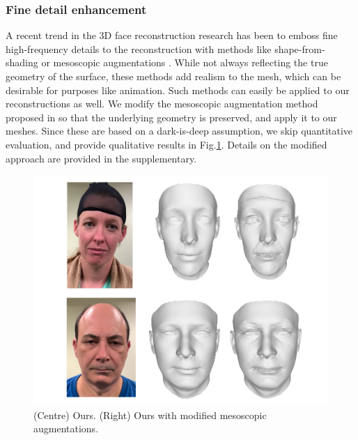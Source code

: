 \documentclass[10pt,twocolumn,letterpaper]{article}
\begin{document}
\subsubsection{Fine detail enhancement}
A recent trend in the 3D face reconstruction research has been to emboss fine high-frequency details to the reconstruction with methods like shape-from-shading \cite{or2015rgbd} or mesoscopic augmentations \cite{beeler2010high}. While not always reflecting the true geometry of the surface, these methods add realism to the mesh, which can be desirable for purposes like animation. Such methods can easily be applied to our reconstructions as well. We modify the mesoscopic augmentation method proposed in \cite{sela2017unrestricted} so that the underlying geometry is preserved, and apply it to our meshes. Since these are based on a dark-is-deep assumption, we skip quantitative evaluation, and provide qualitative results in Fig.\ref{fig:high_freq}. Details on the modified approach are provided in the supplementary.

 \begin{figure}
\begin{center}
  \includegraphics[width=0.6\linewidth]{images/high_freq.png}
\end{center}
  \caption{(Centre) Ours. (Right) Ours with modified mesoscopic augmentations.}
\label{fig:high_freq}
\end{figure}
\end{document}

